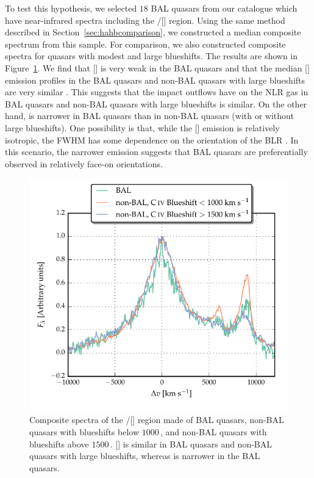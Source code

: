 To test this hypothesis, we selected $18$  BAL quasars from our catalogue which have near-infrared spectra including the \hbns/[] region.
Using the same method described in Section~\ref{sec:hahbcomparison}, we constructed a median composite spectrum from this sample.
For comparison, we also constructed composite spectra for quasars with modest and large  blueshifts.
The results are shown in Figure~\ref{fig:bal_composite}.
We find that [] is very weak in the BAL quasars and that the median [] emission profiles in the BAL quasars and non-BAL quasars with large  blueshifts are very similar \citep[e.g.][]{yuan03}.
This suggests that the impact outflows have on the NLR gas in BAL quasars and non-BAL quasars with large  blueshifts is similar.
On the other hand, \hb is narrower in BAL quasars than in non-BAL quasars (with or without large  blueshifts).
One possibility is that, while the [] emission is relatively isotropic, the \hb FWHM has some dependence on the orientation of the BLR \citep[e.g.][]{shen14}.
In this scenario, the narrower \hb emission suggests that BAL quasars are preferentially observed in relatively face-on orientations.

\begin{figure}[t!]
    \centering
    \includegraphics[width=0.8\linewidth]{figures/chapter04/bal_composite.pdf}
    \caption[{Comparison of the \hbns/[] region for BAL and non-BAL quasars.}]{Composite spectra of the \hbns/[] region made of BAL quasars, non-BAL quasars with  blueshifts below $1000$\,\kms, and non-BAL quasars with  blueshifts above $1500$\,\kms. [] is similar in BAL quasars and non-BAL quasars with large  blueshifts, whereas \hb is narrower in the BAL quasars.}
    \label{fig:bal_composite}
\end{figure}


